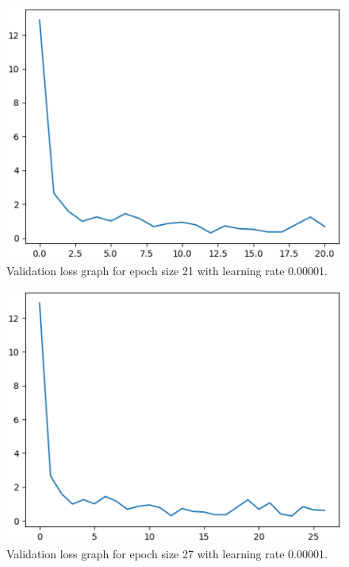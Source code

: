     \begin{figure}
    \includegraphics[width=\textwidth, scale=0.25]{5_30000.eps}
    \caption{Validation loss graph for epoch size 21 with learning rate 0.00001.} \label{Figure4}
    \end{figure}

    \begin{figure}
    \includegraphics[width=\textwidth, scale=0.25]{5_40000.eps}
    \caption{Validation loss graph for epoch size 27 with learning rate 0.00001.} \label{Figure5}
    \end{figure}

